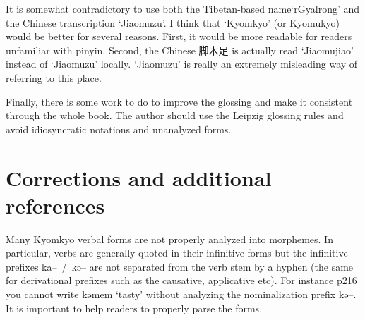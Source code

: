 \documentclass[oldfontcommands,oneside,a4paper,11pt]{article}
\newcommand{\ipa}[1]{{\phon \mbox{#1}}} %
\newcommand{\zh}[1]{{\cn #1}}
\begin{document}
It is somewhat contradictory to use both the Tibetan-based name`rGyalrong' and the Chinese transcription `Jiaomuzu'. I think that `Kyomkyo' (or Kyomukyo) would be better for several reasons. First, it would be more readable for readers unfamiliar with pinyin. Second, the Chinese \zh{脚木足} is actually read `Jiaomujiao' instead of `Jiaomuzu' locally. `Jiaomuzu'  is really an extremely misleading way of referring to this place.

 Finally, there is some work to do to improve the glossing and make it consistent through the whole book. The author should use the Leipzig glossing rules and avoid idiosyncratic notations and unanalyzed forms.


 \section{Corrections and additional references}
Many Kyomkyo verbal forms are not properly analyzed into morphemes. In particular, verbs are generally quoted in their infinitive forms but the infinitive prefixes \ipa{ka-- / kə--} are not separated from the verb stem by a hyphen (the same for derivational prefixes such as the causative, applicative etc). For instance p216 you cannot write \ipa{kəmem} `tasty' without analyzing the nominalization prefix \ipa{kə--}. It is important to help readers to properly parse the forms.
\end{document}
